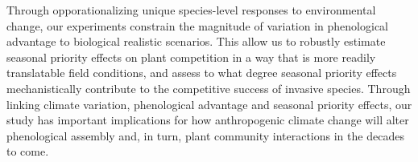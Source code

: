 \documentclass{article}\usepackage[]{graphicx}\usepackage[]{color}
\begin{document}
Through opporationalizing unique species-level responses to environmental change, our experiments constrain the magnitude of variation in phenological advantage to biological realistic scenarios. This allow us to robustly estimate seasonal priority effects on plant competition in a way that is more readily translatable field conditions, and assess to what degree seasonal priority effects mechanistically contribute to the competitive success of invasive species. Through linking climate variation, phenological advantage and seasonal priority effects, our study has important implications for how anthropogenic climate change will alter phenological assembly and, in turn, plant community interactions in the decades to come.
\end{document}
